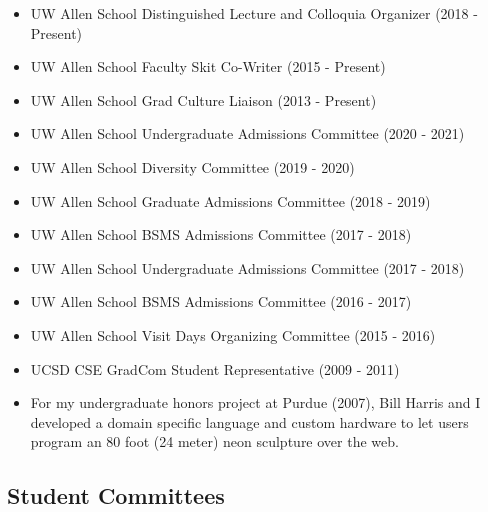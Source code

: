 \documentclass[10pt]{article}
\begin{document}
\begin{itemize}
  \item UW Allen School Distinguished Lecture and Colloquia Organizer (2018 - Present)

  \item UW Allen School Faculty Skit Co-Writer (2015 - Present)

  \item UW Allen School Grad Culture Liaison (2013 - Present)

  \item UW Allen School Undergraduate Admissions Committee (2020 - 2021)

  \item UW Allen School Diversity Committee (2019 - 2020)

  \item UW Allen School Graduate Admissions Committee (2018 - 2019)

  \item UW Allen School BSMS Admissions Committee (2017 - 2018)

  \item UW Allen School Undergraduate Admissions Committee (2017 - 2018)

  \item UW Allen School BSMS Admissions Committee (2016 - 2017)

  \item UW Allen School Visit Days Organizing Committee (2015 - 2016)

  \item UCSD CSE GradCom Student Representative (2009 - 2011)

  \item For my undergraduate honors project at Purdue (2007),
        Bill Harris and I developed a domain specific language
        and custom hardware to let users program
        an 80 foot (24 meter) neon sculpture over the web.
\end{itemize}

\subsection*{Student Committees}

\end{document}
